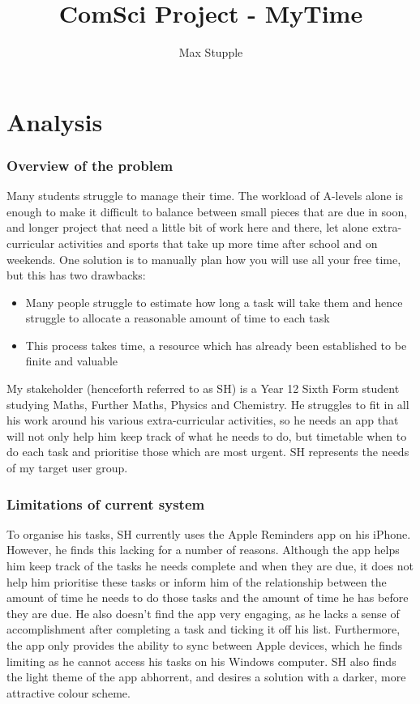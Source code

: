\documentclass{article}
\title{ComSci Project - MyTime}
\author{Max Stupple}
\date{}
\begin{document}
    
\maketitle

\tableofcontents

\part{Analysis}
\section{Overview of the problem}
Many students struggle to manage their time. The workload of A-levels alone is
enough to make it difficult to balance between small pieces that are due in
soon, and longer project that need a little bit of work here and there, let
alone extra-curricular activities and sports that take up more time after school
and on weekends. One solution is to manually plan how you will use all your free
time, but this has two drawbacks:
        
\begin{itemize}
\item Many people struggle to estimate how long a task will take them and hence
  struggle to allocate a reasonable amount of time to each task
\item This process takes time, a resource which has already been established to
  be finite and valuable
\end{itemize}

My stakeholder (henceforth referred to as SH) is a Year 12 Sixth Form student
studying Maths, Further Maths, Physics and Chemistry. He struggles to fit in all
his work around his various extra-curricular activities, so he needs an app that
will not only help him keep track of what he needs to do, but timetable when to
do each task and prioritise those which are most urgent. SH represents the needs
of my target user group.

\section{Limitations of current system}
To organise his tasks, SH currently uses the Apple Reminders app on his iPhone.
However, he finds this lacking for a number of reasons. Although the app helps
him keep track of the tasks he needs complete and when they are due, it does not
help him prioritise these tasks or inform him of the relationship between the
amount of time he needs to do those tasks and the amount of time he has before
they are due. He also doesn't find the app very engaging, as he lacks a sense of
accomplishment after completing a task and ticking it off his list. Furthermore,
the app only provides the ability to sync between Apple devices, which he finds
limiting as he cannot access his tasks on his Windows computer. SH also finds
the light theme of the app abhorrent, and desires a solution with a darker, more
attractive colour scheme.
\end{document}
